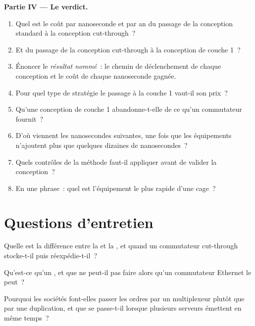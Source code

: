 \begin{problem}
\medskip\noindent\textbf{Partie IV --- Le verdict.}
\begin{enumerate}[resume]
\item Quel est le coût par nanoseconde et par an du passage de la conception standard à la conception cut-through~?
\item Et du passage de la conception cut-through à la conception de couche 1~?
\item Énoncer le \emph{résultat nommé}~: le chemin de déclenchement de chaque conception et le coût de chaque nanoseconde gagnée.
\item Pour quel type de stratégie le passage à la couche 1 vaut-il son prix~?
\item Qu'une conception de couche 1 abandonne-t-elle de ce qu'un commutateur fournit~?
\item D'où viennent les nanosecondes suivantes, une fois que les équipements n'ajoutent plus que quelques dizaines de nanosecondes~?
\item Quels contrôles de la méthode faut-il appliquer avant de valider la conception~?
\item En une phrase~: quel est l'équipement le plus rapide d'une cage~?
\end{enumerate}
\end{problem}

\section{Questions d'entretien}

\begin{interviewq}\label{iq:nw:switches-and-layer-1-devices:1}
Quelle est la différence entre la  et la , et quand un commutateur cut-through stocke-t-il puis réexpédie-t-il~?
\end{interviewq}

\begin{interviewq}\label{iq:nw:switches-and-layer-1-devices:2}
Qu'est-ce qu'un , et que ne peut-il pas faire alors qu'un commutateur Ethernet le peut~?
\end{interviewq}

\begin{interviewq}\label{iq:nw:switches-and-layer-1-devices:3}
Pourquoi les sociétés font-elles passer les ordres par un multiplexeur plutôt que par une duplication, et que se passe-t-il lorsque plusieurs serveurs émettent en même temps~?
\end{interviewq}

